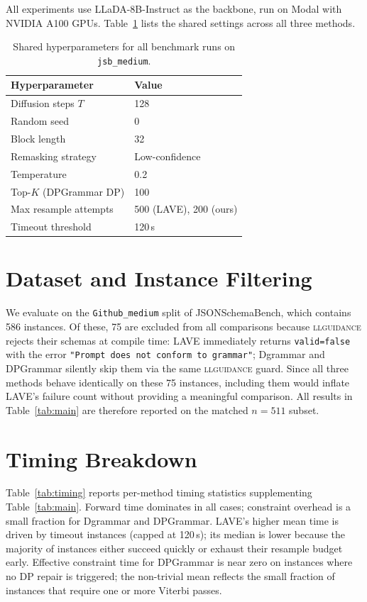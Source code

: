 All experiments use LLaDA-8B-Instruct as the backbone, run on Modal with NVIDIA A100 GPUs.
Table~\ref{tab:hyperparams} lists the shared settings across all three methods.

\begin{table}[h]
\centering
\small
\begin{tabular}{ll}
\toprule
\textbf{Hyperparameter} & \textbf{Value} \\
\midrule
Diffusion steps $T$          & 128 \\
Random seed                  & 0 \\
Block length                 & 32 \\
Remasking strategy           & Low-confidence \\
Temperature                  & 0.2 \\
Top-$K$ (DPGrammar DP)       & 100 \\
Max resample attempts        & 500 (LAVE), 200 (ours) \\
Timeout threshold            & 120\,s \\
\bottomrule
\end{tabular}
\caption{Shared hyperparameters for all benchmark runs on \texttt{jsb\_medium}.}
\label{tab:hyperparams}
\end{table}

\section{Dataset and Instance Filtering}
\label{app:data}

We evaluate on the \texttt{Github\_medium} split of JSONSchemaBench, which contains 586 instances.
Of these, 75 are excluded from all comparisons because \textsc{llguidance} rejects their schemas at compile time: LAVE immediately returns \texttt{valid=false} with the error \texttt{"Prompt does not conform to grammar"}; Dgrammar and DPGrammar silently skip them via the same \textsc{llguidance} guard.
Since all three methods behave identically on these 75 instances, including them would inflate LAVE's failure count without providing a meaningful comparison.
All results in Table~\ref{tab:main} are therefore reported on the matched $n{=}511$ subset.

\section{Timing Breakdown}
\label{app:timing}

Table~\ref{tab:timing} reports per-method timing statistics supplementing Table~\ref{tab:main}.
Forward time dominates in all cases; constraint overhead is a small fraction for Dgrammar and DPGrammar.
LAVE's higher mean time is driven by timeout instances (capped at 120\,s); its median is lower because the majority of instances either succeed quickly or exhaust their resample budget early.
Effective constraint time for DPGrammar is near zero on instances where no DP repair is triggered; the non-trivial mean reflects the small fraction of instances that require one or more Viterbi passes.

